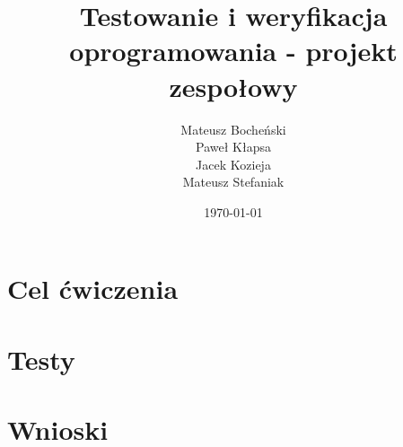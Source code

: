 \documentclass[a4paper,11pt,notitlepage]{article}
\author{Mateusz Bocheński\\Paweł Kłapsa\\Jacek Kozieja\\Mateusz Stefaniak}
\title{Testowanie i weryfikacja oprogramowania - projekt zespołowy}
\date{\today}
\begin{document}
\maketitle
\tableofcontents

\section{Cel ćwiczenia}

\section{Testy}

\section{Wnioski}
\end{document}

